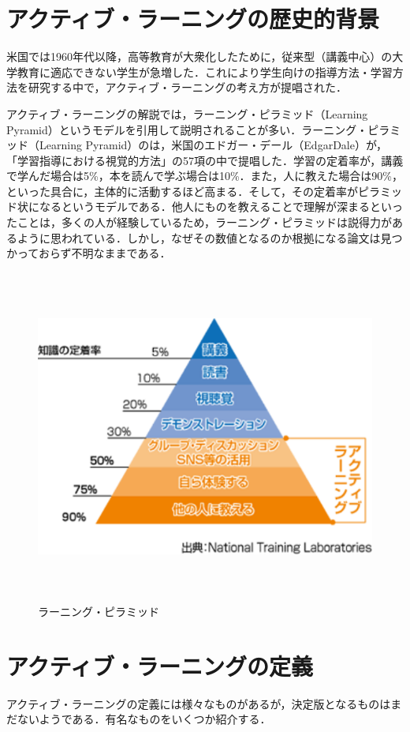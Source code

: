 \section{アクティブ・ラーニングの歴史的背景}

米国では1960年代以降，高等教育が大衆化したために，従来型（講義中心）の大学教育に適応できない学生が急増した．これにより学生向けの指導方法・学習方法を研究する中で，アクティブ・ラーニングの考え方が提唱された．

アクティブ・ラーニングの解説では，ラーニング・ピラミッド（Learning Pyramid）というモデルを引用して説明されることが多い．ラーニング・ピラミッド（Learning Pyramid）のは，米国のエドガー・デール（EdgarDale）が，「学習指導における視覚的方法」の57項の中で提唱した．学習の定着率が，講義で学んだ場合は5\%，本を読んで学ぶ場合は10\%．また，人に教えた場合は90\%，といった具合に，主体的に活動するほど高まる．そして，その定着率がピラミッド状になるというモデルである．他人にものを教えることで理解が深まるといったことは，多くの人が経験しているため，ラーニング・ピラミッドは説得力があるように思われている．しかし，なぜその数値となるのか根拠になる論文は見つかっておらず不明なままである．



\begin{figure}[h]
\centering
\includegraphics[height=11cm,width=13cm]{P.pdf}
\caption{ラーニング・ピラミッド}\label{サンプル図}
\end{figure}


\section{アクティブ・ラーニングの定義}
アクティブ・ラーニングの定義には様々なものがあるが，決定版となるものはまだないようである．有名なものをいくつか紹介する．

